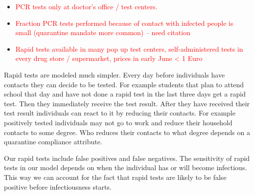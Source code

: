 \begin{itemize}
    \item \textcolor{red}{PCR tests only at doctor's office / test centers.}
    \item \textcolor{red}{Fraction PCR tests performed because of contact with infected
    people is small (quarantine mandate more common) -- need citation}
    \item \textcolor{red}{Rapid tests available in many pop up test centers,
    self-administered tests in every  drug store / supermarket, prices in early June < 1
    Euro}
\end{itemize}


Rapid tests are modeled much simpler. Every day before individuals have contacts they can
decide to be tested. For example students that plan to
attend school that day and have not done a rapid test in the last three days get a rapid
test. Then they immediately receive the test result. After they have received their test
result individuals can react to it by reducing their contacts. For example positively
tested individuals may not go to work and reduce their household contacts to some degree.
Who reduces their contacts to what degree depends on a quarantine compliance attribute.

Our rapid tests include false positives and false negatives. The sensitivity of rapid
tests in our model depends on when the individual has or will become infectious. This way
we can account for the fact that rapid tests are likely to be false positive before
infectiousness starts.


